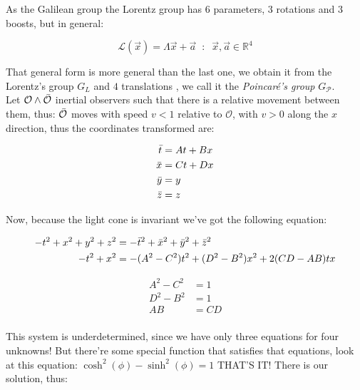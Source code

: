                 As the Galilean group the Lorentz group has $6$ parameters, $3$ rotations and $3$ boosts, but in general:

        \begin{equation*}
            \mathcal{L}(\vec{x}) = \Lambda \vec{x} + \vec{a} \;\;:\;\; \vec{x},\vec{a} \in \mathbb{R}^4
        \end{equation*}

        That general form is more general than the last one, we obtain it from the Lorentz's group $G_L$ and $4$ translations , we call it the \textit{Poincaré's group} $G_{\mathscr{P}}$.\\

        Let $\mathcal{O} \wedge \Bar{\mathcal{O}}$ inertial observers such that there is a relative movement between them, thus: $\Bar{\mathcal{O}}$ moves with speed $v<1$ relative to $\mathcal{O}$, with $v>0$ along the $x$ direction, thus the coordinates transformed are:

        \begin{align*}
            \Bar{t} &= At + Bx \\
            \Bar{x} &= Ct + Dx \\
            \Bar{y} &= y\\
            \Bar{z} &= z
        \end{align*}
        
        Now, because the light cone is invariant we've got the following equation:
        
        \begin{align*}
            -t^2 + x^2 + y^2 + z^2 &= -\Bar{t}^2 + \Bar{x}^2 + \Bar{y}^2 + \Bar{z}^2 \\
            -t^2 + x^2 &= -(A^2 - C^2)t^2 + (D^2-B^2)x^2 + 2(CD - AB)tx
        \end{align*}
        
        \begin{align*}
            A^2 - C^2 &= 1\\
            D^2-B^2 &= 1\\
            AB &= CD\\
        \end{align*}
        
        This system is underdetermined, since we have only three equations for four unknowns! But there're some special function that satisfies that equations, look at this equation: $\cosh^2(\phi) - \sinh^2(\phi) = 1$ THAT'S IT! There is our solution, thus: 
        

